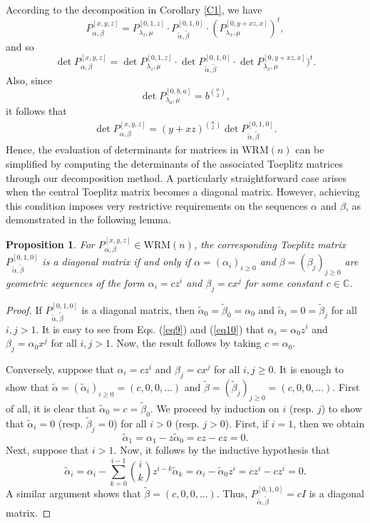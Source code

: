 \documentclass{amsart}
\newtheorem{pro}{Proposition}
\begin{document}
According to the decomposition in Corollary \ref{C1}, we have 
\[P_{\alpha,\beta}^{[x, y, z]} = P_{\lambda_z, \mu}^{[0, 1, z]} \cdot P_{\widetilde{\alpha},\widetilde{\beta}}^{[0,1,0]} \cdot (P_{\lambda_x,\mu}^{[0, y+xz, x]})^t,\]
and so
\[\det P_{\alpha,\beta}^{[x, y, z]}=\det P_{\lambda_z,\mu}^{[0,1,z]} \cdot \det P_{\widetilde{\alpha},\widetilde{\beta}}^{[0,1,0]} \cdot \det P_{\lambda_x,\mu}^{[0,y+xz, x]})^t.\]
Also, since 
\[\det P_{\lambda_a, \mu}^{[0, b, a]}=b^{\binom{n}{2}},\]
it follows that 
 \begin{align}\label{eq11}
 \det P_{\alpha,\beta}^{[x, y, z]}=(y+xz)^{\binom{n}{2}} \det P_{\widetilde{\alpha},\widetilde{\beta}}^{[0,1,0]}.
  \end{align}
Hence, the evaluation of determinants for matrices in $\mathrm{WRM}(n)$ can be simplified by computing the determinants of the associated Toeplitz matrices through our decomposition method. A particularly straightforward case arises when the central Toeplitz matrix becomes a diagonal matrix. However, achieving this condition imposes very restrictive requirements on the sequences $\alpha$ and $\beta$, as demonstrated in the following lemma.
\begin{pro}\label{pro3}
For $P_{\alpha, \beta}^{[x, y, z]} \in \mathrm{WRM}(n)$, the corresponding Toeplitz matrix $P_{\widetilde{\alpha}, \widetilde{\beta}}^{[0,1,0]}$ is a diagonal matrix  if and only if $\alpha=(\alpha_i)_{i\geq 0}$ and $\beta=(\beta_j)_{j\geq 0}$ are geometric sequences of the form $\alpha_i=c z^i$ and $\beta_j=c x^j$ for some constant $c\in \mathbb{C}$.
\end{pro}
\begin{proof}
If $P_{\widetilde{\alpha}, \widetilde{\beta}}^{[0,1,0]}$ is a diagonal matrix, then $\widetilde{\alpha}_0=\widetilde{\beta}_0=\alpha_0$ and $\widetilde{\alpha}_i=0=\widetilde{\beta}_j$ for all $i, j>1$. It is easy to see from Eqs. (\ref{eq9}) and (\ref{eq10}) that $\alpha_i= \alpha_0 z^i$ and $\beta_j=\alpha_0 x^j$ for all $i, j>1$. Now, the result follows by taking $c=\alpha_0$.

Conversely, suppose that $\alpha_i=c z^i$ and $\beta_j=c x^j$ for all $i, j\geq 0$. It is enough to show that 
$\widetilde{\alpha}=(\widetilde{\alpha}_i)_{i\geq 0}=(c, 0, 0,  \ldots)$ and $\widetilde{\beta}=(\widetilde{\beta}_j)_{j\geq 0}=(c, 0, 0,  \ldots)$. First of all, it is clear that $\widetilde{\alpha}_0=c=\widetilde{\beta}_0$. We proceed by induction on $i$ (resp. $j$) to show that $\widetilde{\alpha}_i=0$ (resp. $\widetilde{\beta}_j=0$) for all $i>0$ (resp. $j>0$). First, if $i=1$, then we obtain  
$$\widetilde{\alpha}_1=\alpha_1-z\widetilde{\alpha}_0=cz-cz=0.$$ 
Next, suppose that $i>1$. Now, it follows by the inductive hypothesis that
$$\widetilde{\alpha}_i=\alpha_i-\sum_{k=0}^{i-1} \binom{i}{k} z^{i-k} \widetilde{\alpha}_k=\alpha_i-\widetilde{\alpha}_0z^i=cz^i-cz^i=0.
$$
A similar argument shows that $\widetilde{\beta}=(c, 0, 0,  \ldots)$. 
Thus, $P_{\widetilde{\alpha},\widetilde{\beta}}^{[0,1,0]}=cI$ is a diagonal matrix.
\end{proof}
\end{document}
